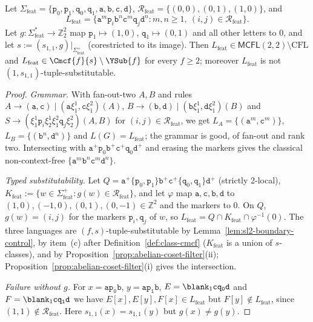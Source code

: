 \begin{proposition}
\label{prop:feature-cross-typed}
Let $\Sigma_{\mathrm{feat}}=\{\mathtt p_0,\mathtt p_1,\mathtt q_0,\mathtt q_1,
\mathtt a,\mathtt b,\mathtt c,\mathtt d\}$, $\mathcal R_{\mathrm{feat}}=
\{(0,0),(0,1),(1,0)\}$, and
\[
 L_{\mathrm{feat}}=\{\mathtt a^m\mathtt p_i\mathtt b^n\mathtt c^m\mathtt q_j\mathtt d^n:
 m,n\ge1,\ (i,j)\in\mathcal R_{\mathrm{feat}}\}.
\]
Let $g:\Sigma_{\mathrm{feat}}^*\to\mathbb Z_2^2$ map $\mathtt p_1\mapsto(1,0)$,
$\mathtt q_1\mapsto(0,1)$ and all other letters to $0$, and let
$s:=(s_{1,1},g)|_{\Sigma_{\mathrm{feat}}^+}$ (corestricted to its image).  Then
$L_{\mathrm{feat}}\in\mathsf{MCFL}(2,2)\setminus\mathrm{CFL}$ and
$L_{\mathrm{feat}}\in\Cmcf{f}{s}\setminus\YSub{f}$ for every $f\ge2$; moreover
$L_{\mathrm{feat}}$ is not $(1,s_{1,1})$-tuple-substitutable.
\end{proposition}

\begin{proof}
\emph{Grammar.}  With fan-out-two $A,B$ and rules
$A\to(\mathtt a,\mathtt c)\mid(\mathtt a\xi_1^1,\mathtt c\xi_1^2)(A)$,
$B\to(\mathtt b,\mathtt d)\mid(\mathtt b\xi_1^1,\mathtt d\xi_1^2)(B)$ and
$S\to(\xi_1^1\mathtt p_i\xi_2^1\xi_1^2\mathtt q_j\xi_2^2)(A,B)$ for
$(i,j)\in\mathcal R_{\mathrm{feat}}$, we get $L_A=\{(\mathtt a^m,\mathtt c^m)\}$,
$L_B=\{(\mathtt b^n,\mathtt d^n)\}$ and $L(G)=L_{\mathrm{feat}}$; the grammar is good,
of fan-out and rank two.  Intersecting with $\mathtt a^+\mathtt p_0\mathtt b^+
\mathtt c^+\mathtt q_0\mathtt d^+$ and erasing the markers gives the classical
non-context-free $\{\mathtt a^m\mathtt b^n\mathtt c^m\mathtt d^n\}$.

\emph{Typed substitutability.}  Let
$Q=\mathtt a^+\{\mathtt p_0,\mathtt p_1\}\mathtt b^+\mathtt c^+\{\mathtt q_0,\mathtt q_1\}
\mathtt d^+$ (strictly 2-local), $K_{\mathrm{feat}}:=\{w\in\Sigma_{\mathrm{feat}}^+:
g(w)\in\mathcal R_{\mathrm{feat}}\}$, and let $\varphi$ map
$\mathtt a,\mathtt c,\mathtt b,\mathtt d$ to $(1,0),(-1,0),(0,1),(0,-1)\in\mathbb Z^2$
and the markers to $0$.  On $Q$, $g(w)=(i,j)$ for the markers $\mathtt p_i,\mathtt q_j$
of $w$, so $L_{\mathrm{feat}}=Q\cap K_{\mathrm{feat}}\cap\varphi^{-1}(0)$.  The three
languages are $(f,s)$-tuple-substitutable by Lemma~\ref{lem:sl2-boundary-control},
by item~(c) after Definition~\ref{def:class-cmcf} ($K_{\mathrm{feat}}$ is a union of
$s$-classes), and by Proposition~\ref{prop:abelian-coset-filter}(ii);
Proposition~\ref{prop:abelian-coset-filter}(i) gives the intersection.

\emph{Failure without $g$.}  For $x=\mathtt{ap_0b}$, $y=\mathtt{ap_1b}$,
$E=\blank_1\mathtt{cq_0d}$ and $F=\blank_1\mathtt{cq_1d}$ we have
$E[x],E[y],F[x]\in L_{\mathrm{feat}}$ but $F[y]\notin L_{\mathrm{feat}}$, since
$(1,1)\notin\mathcal R_{\mathrm{feat}}$.  Here $s_{1,1}(x)=s_{1,1}(y)$ but
$g(x)\ne g(y)$.
\end{proof}

